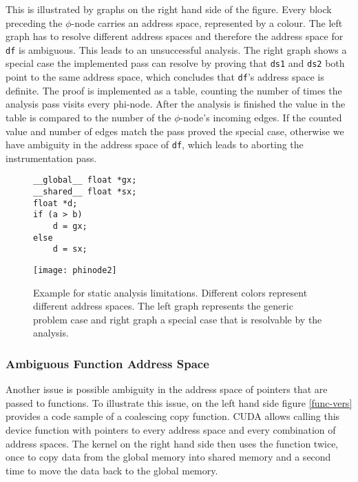 This is illustrated by graphs on the right hand side of the figure. Every block preceding the $\phi$-node carries an address space, represented by a colour.
The left graph has to resolve different address spaces and therefore the address space for \verb|df| is ambiguous. This leads to an unsuccessful analysis. The right graph shows a special case the implemented pass can resolve by proving that \verb|ds1| and \verb|ds2| both point to the same address space, which concludes that \verb|df|'s address space is definite. The proof is implemented as a table, counting the number of times the analysis pass visits every phi-node. After the analysis is finished the value in the table is compared to the number of the $\phi$-node's incoming edges. If the counted value and number of edges match the pass proved the special case, otherwise we have ambiguity in the address space of \verb|df|, which leads to aborting the instrumentation pass.

\begin{figure}[t]
		\begin{minipage}{0.35\textwidth}

		\begin{lstlisting}[style=c]
__global__ float *gx;
__shared__ float *sx;
float *d;
if (a > b)
	d = gx;
else 
	d = sx;	\end{lstlisting}
			\end{minipage}\hfill
	\begin{minipage}{0.6\textwidth}
		\centering
		\texttt{[image: phinode2]}
	\end{minipage}\hfill
	\caption{Example for static analysis limitations. Different colors represent different address spaces. The left graph represents the generic problem case and right graph a special case that is resolvable by the analysis.}
	\label{phinodes}
\end{figure}

\subsubsection{Ambiguous Function Address Space}\label{func-vers-sec}
Another issue is possible ambiguity in the address space of pointers that are passed to functions. To illustrate this issue, on the left hand side figure \ref{func-vers} provides  a code sample of a coalescing copy function. CUDA allows calling this device function with pointers to every address space and every combination of address spaces. The kernel on the right hand side then uses the function twice, once to copy data from the global memory into shared memory and a second time to move the data back to the global memory.

